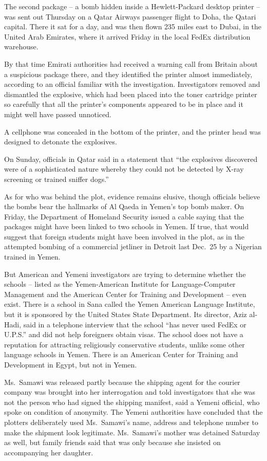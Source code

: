 ﻿\documentclass[12pt]{article}
\begin{document}
The second package -- a bomb hidden inside a Hewlett-Packard desktop printer -- was sent out
Thursday on a Qatar Airways passenger flight to Doha, the Qatari capital. There it sat for a day,
and was then flown 235 miles east to Dubai, in the United Arab Emirates, where it arrived Friday in
the local FedEx distribution warehouse.

By that time Emirati authorities had received a warning call from Britain about a suspicious package
there, and they identified the printer almost immediately, according to an official familiar with
the investigation. Investigators removed and dismantled the explosive, which had been placed into
the toner cartridge printer so carefully that all the printer's components appeared to be in place
and it might well have passed unnoticed.

A cellphone was concealed in the bottom of the printer, and the printer head was designed to
detonate the explosives.

On Sunday, officials in Qatar said in a statement that ``the explosives discovered were of a
sophisticated nature whereby they could not be detected by X-ray screening or trained sniffer
dogs.''

As for who was behind the plot, evidence remains elusive, though officials believe the bombs bear
the hallmarks of Al Qaeda in Yemen's top bomb maker. On Friday, the Department of Homeland Security
issued a cable saying that the packages might have been linked to two schools in Yemen. If true,
that would suggest that foreign students might have been involved in the plot, as in the attempted
bombing of a commercial jetliner in Detroit last Dec.~25 by a Nigerian trained in Yemen.

But American and Yemeni investigators are trying to determine whether the schools -- listed as the
Yemen-American Institute for Language-Computer Management and the American Center for Training and
Development -- even exist. There is a school in Sana called the Yemen American Language Institute,
but it is sponsored by the United States State Department. Its director, Aziz al-Hadi, said in a
telephone interview that the school ``has never used FedEx or U.P.S.'' and did not help foreigners
obtain visas. The school does not have a reputation for attracting religiously conservative
students, unlike some other language schools in Yemen. There is an American Center for Training and
Development in Egypt, but not in Yemen.

Ms.~Samawi was released partly because the shipping agent for the courier company was brought into
her interrogation and told investigators that she was not the person who had signed the shipping
manifest, said a Yemeni official, who spoke on condition of anonymity. The Yemeni authorities have
concluded that the plotters deliberately used Ms.~Samawi's name, address and telephone number to
make the shipment look legitimate. Ms.~Samawi's mother was detained Saturday as well, but family
friends said that was only because she insisted on accompanying her daughter.
\end{document}
